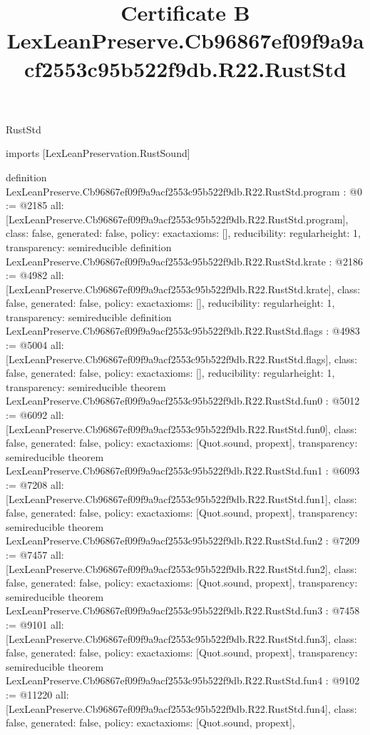 \begin{lexlean}{RustStd}
\title{Certificate B LexLeanPreserve.Cb96867ef09f9a9acf2553c95b522f9db.R22.RustStd}
\begin{coremodule}
imports [LexLeanPreservation.RustSound]

definition LexLeanPreserve.Cb96867ef09f9a9acf2553c95b522f9db.R22.RustStd.program : @0 := @2185 {
  all: [LexLeanPreserve.Cb96867ef09f9a9acf2553c95b522f9db.R22.RustStd.program],
  class: false,
  generated: false,
  policy: exact{axioms: []},
  reducibility: regular{height: 1},
  transparency: semireducible
}
definition LexLeanPreserve.Cb96867ef09f9a9acf2553c95b522f9db.R22.RustStd.krate : @2186 := @4982 {
  all: [LexLeanPreserve.Cb96867ef09f9a9acf2553c95b522f9db.R22.RustStd.krate],
  class: false,
  generated: false,
  policy: exact{axioms: []},
  reducibility: regular{height: 1},
  transparency: semireducible
}
definition LexLeanPreserve.Cb96867ef09f9a9acf2553c95b522f9db.R22.RustStd.flags : @4983 := @5004 {
  all: [LexLeanPreserve.Cb96867ef09f9a9acf2553c95b522f9db.R22.RustStd.flags],
  class: false,
  generated: false,
  policy: exact{axioms: []},
  reducibility: regular{height: 1},
  transparency: semireducible
}
theorem LexLeanPreserve.Cb96867ef09f9a9acf2553c95b522f9db.R22.RustStd.fun0 : @5012 := @6092 {
  all: [LexLeanPreserve.Cb96867ef09f9a9acf2553c95b522f9db.R22.RustStd.fun0],
  class: false,
  generated: false,
  policy: exact{axioms: [Quot.sound, propext]},
  transparency: semireducible
}
theorem LexLeanPreserve.Cb96867ef09f9a9acf2553c95b522f9db.R22.RustStd.fun1 : @6093 := @7208 {
  all: [LexLeanPreserve.Cb96867ef09f9a9acf2553c95b522f9db.R22.RustStd.fun1],
  class: false,
  generated: false,
  policy: exact{axioms: [Quot.sound, propext]},
  transparency: semireducible
}
theorem LexLeanPreserve.Cb96867ef09f9a9acf2553c95b522f9db.R22.RustStd.fun2 : @7209 := @7457 {
  all: [LexLeanPreserve.Cb96867ef09f9a9acf2553c95b522f9db.R22.RustStd.fun2],
  class: false,
  generated: false,
  policy: exact{axioms: [Quot.sound, propext]},
  transparency: semireducible
}
theorem LexLeanPreserve.Cb96867ef09f9a9acf2553c95b522f9db.R22.RustStd.fun3 : @7458 := @9101 {
  all: [LexLeanPreserve.Cb96867ef09f9a9acf2553c95b522f9db.R22.RustStd.fun3],
  class: false,
  generated: false,
  policy: exact{axioms: [Quot.sound, propext]},
  transparency: semireducible
}
theorem LexLeanPreserve.Cb96867ef09f9a9acf2553c95b522f9db.R22.RustStd.fun4 : @9102 := @11220 {
  all: [LexLeanPreserve.Cb96867ef09f9a9acf2553c95b522f9db.R22.RustStd.fun4],
  class: false,
  generated: false,
  policy: exact{axioms: [Quot.sound, propext]},
}
\end{coremodule}
\end{lexlean}
